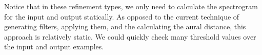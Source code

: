 \begin{exmp}
Notice that in these refinement types, we only need to calculate the spectrogram for the input and output statically.
As opposed to the current technique of generating filters, applying them, and the calculating the aural distance, this approach is relatively static.
We could quickly check many threshold values over the input and output examples.

\end{exmp}
